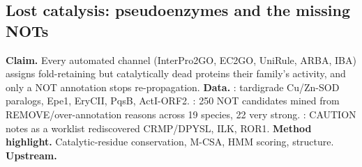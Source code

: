 \subsection{Lost catalysis: pseudoenzymes and the missing NOTs}\label{sec:dd-pseudo}
\textbf{Claim.} Every automated channel (InterPro2GO, EC2GO, UniRule, ARBA, IBA) assigns
fold-retaining but catalytically dead proteins their family's activity, and only a NOT annotation
stops re-propagation.
\textbf{Data.} : tardigrade Cu/Zn-SOD paralogs, Epe1, EryCII, PqsB,
ActI-ORF2. : 250 NOT candidates mined from REMOVE/over-annotation reasons
across 19 species, 22 very strong. : CAUTION notes as a worklist
rediscovered CRMP/DPYSL, ILK, ROR1.
\textbf{Method highlight.} Catalytic-residue conservation, M-CSA, HMM scoring, structure.
\textbf{Upstream.} 
